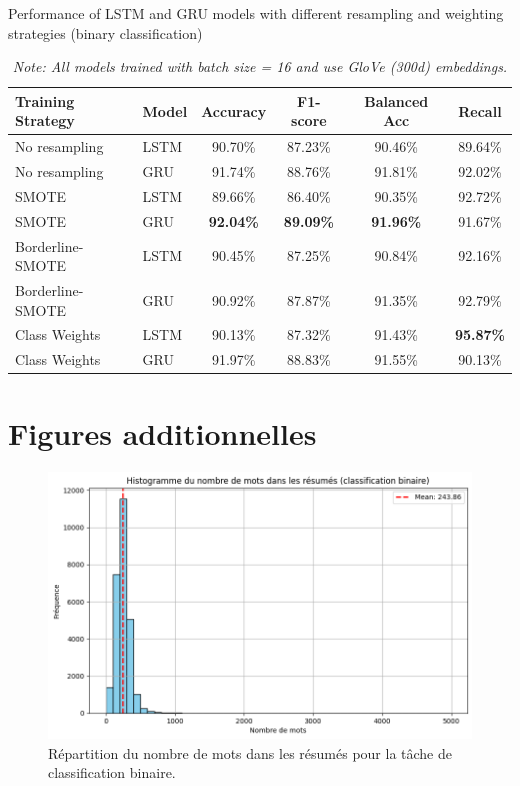 \documentclass[12pt]{report}
\begin{document}
\begin{table}[H]
\centering
\scriptsize
\caption{Performance of LSTM and GRU models with different resampling and weighting strategies (binary classification)}
\begin{tabular}{|l|l|c|c|c|c|}
\hline
\textbf{Training Strategy} & \textbf{Model} & \textbf{Accuracy} & \textbf{F1-score} & \textbf{Balanced Acc} & \textbf{Recall} \\
\hline
No resampling & LSTM & 90.70\% & 87.23\% & 90.46\% & 89.64\% \\
No resampling & GRU  & 91.74\% & 88.76\% & 91.81\% & 92.02\% \\
\hline
SMOTE & LSTM & 89.66\% & 86.40\% & 90.35\% & 92.72\% \\
SMOTE & GRU  & \textbf{92.04\%} & \textbf{89.09\%} & \textbf{91.96\%} & 91.67\% \\
\hline
Borderline-SMOTE & LSTM & 90.45\% & 87.25\% & 90.84\% & 92.16\% \\
Borderline-SMOTE & GRU  & 90.92\% & 87.87\% & 91.35\% & 92.79\% \\
\hline
Class Weights & LSTM & 90.13\% & 87.32\% & 91.43\% & \textbf{95.87\%} \\
Class Weights & GRU  & 91.97\% & 88.83\% & 91.55\% & 90.13\% \\
\hline
\end{tabular}
\vspace{0.5em}
\caption*{\textit{Note: All models trained with batch size = 16 and use GloVe (300d) embeddings.}}
\label{tab:performance_resampling_multi}
\end{table}







\section{Figures additionnelles}

\begin{figure}[H]
\centering
\includegraphics[width=0.5\linewidth]{word_distribution_per_abstract_binary_class.png}
\caption{Répartition du nombre de mots dans les résumés pour la tâche de classification binaire.}
\label{fig:word_distribution_binary_class}
\end{figure}
\end{document}
